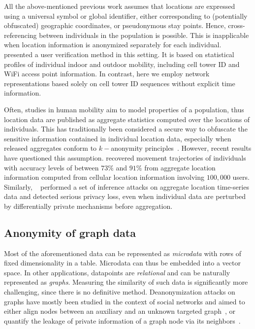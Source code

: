 All the above-mentioned previous work assumes that locations are expressed using a universal symbol or global identifier, either corresponding to (potentially obfuscated) geographic coordinates, or pseudonymous stay points.
Hence, cross-referencing between individuals in the population is possible.
This is inapplicable when location information is anonymized separately for each individual.
\textcite{LinMobile} presented a user verification method in this setting.
It is based on statistical profiles of individual indoor and outdoor mobility, including cell tower ID and WiFi access point information.
In contrast, here we employ network representations based solely on cell tower ID sequences without explicit time information.

Often, studies in human mobility aim to model properties of a population, thus location data are published as aggregate statistics computed over the locations of individuals.
This has traditionally been considered a secure way to obfuscate the sensitive information contained in individual location data, especially when released aggregates conform to $ k-$anonymity principles~\citep{sweeney2002k}.
However, recent results have questioned this assumption.
\textcite{xu2017trajectory} recovered movement trajectories of individuals with accuracy levels of between $73\%$ and $91\%$ from aggregate location information computed from cellular location information involving $100,000$ users. Similarly, ~\textcite{pyrgelis2017does} performed a set of inference attacks on aggregate location time-series data and detected serious privacy loss, even when individual data are perturbed by differentially private mechanisms before aggregation.

\subsection{Anonymity of graph data }
Most of the aforementioned data can be represented as \emph{microdata} with rows of fixed dimensionality in a table.
Microdata can thus be embedded into a vector space.
In other applications, datapoints are \emph{relational} and can be naturally represented as \emph{graphs}.
Measuring the similarity of such data is significantly more challenging, since there is no definitive method.
Deanonymization attacks on graphs have mostly been studied in the context of social networks and aimed to either align nodes between an auxiliary and an unknown targeted graph~\citep{narayanan2009anonymizing, sharad2014}, or quantify the leakage of private information of a graph node via its neighbors~\citep{zheleva09}.

